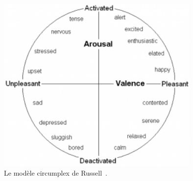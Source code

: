 \begin{figure}
  \centering
  \includegraphics[width=10cm]{./Chapitre1/figures/Circumplex.png}
  \caption{Le modèle circumplex de Russell~\cite{Russell1980}.}
  \label{fig:Circumplex}
\end{figure}
